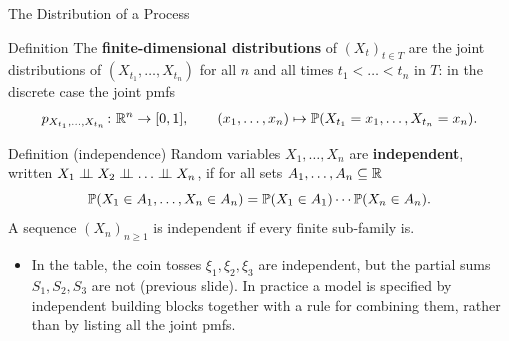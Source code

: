 \begin{frame}{The Distribution of a Process}
  \label{fr:fdd}
  \small
  \begin{block}{Definition}
    The \textbf{finite-dimensional distributions} of $(X_t)_{t\in T}$ are the joint distributions of $(X_{t_1},\dots,X_{t_n})$ for all $n$ and all times $t_1<\dots<t_n$ in $T$: in the discrete case the joint pmfs
    \[
      p_{X_{t_1},\dots,X_{t_n}}\colon\mathbb{R}^n\to[0,1],\qquad (x_1,\dots,x_n)\mapsto\mathbb{P}(X_{t_1}=x_1,\dots,X_{t_n}=x_n).
    \]
  \end{block}
  \begin{block}{Definition (independence)}
    Random variables $X_1,\dots,X_n$ are \textbf{independent}, written $X_1\indep X_2\indep\dots\indep X_n$, if for all sets $A_1,\dots,A_n\subseteq\mathbb{R}$
    \[
      \mathbb{P}(X_1\in A_1,\dots,X_n\in A_n)=\mathbb{P}(X_1\in A_1)\cdots\mathbb{P}(X_n\in A_n).
    \]
    A sequence $(X_n)_{n\ge1}$ is independent if every finite sub-family is.
  \end{block}
  \begin{itemize}
    \item In the table, the coin tosses $\xi_1,\xi_2,\xi_3$ are independent, but the partial sums $S_1,S_2,S_3$ are not (previous slide). In practice a model is specified by independent building blocks together with a rule for combining them, rather than by listing all the joint pmfs.
  \end{itemize}
\end{frame}



